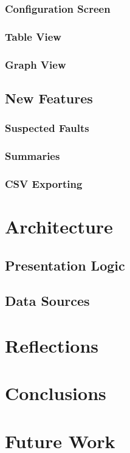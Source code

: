 \documentclass{article}
\begin{document}
\subsubsection{Configuration Screen}
\subsubsection{Table View}
\subsubsection{Graph View}
\subsection{New Features}
\subsubsection{Suspected Faults}
\subsubsection{Summaries}
\subsubsection{CSV Exporting}

\section{Architecture}
\subsection{Presentation Logic}
\subsection{Data Sources}
\section{Reflections}
\section{Conclusions}

\section{Future Work}



\end{document}
